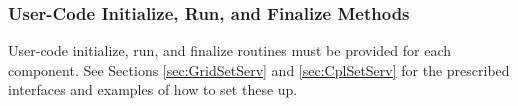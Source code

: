 \subsubsection{User-Code Initialize, Run, and Finalize Methods}

User-code initialize, run, and finalize routines must be provided for
each component.  See Sections \ref{sec:GridSetServ} and \ref{sec:CplSetServ}
for the prescribed interfaces and examples of how to set these up.



